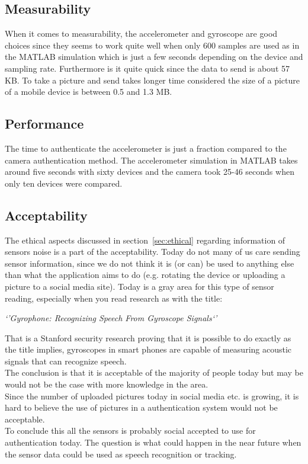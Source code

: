 \subsection*{Measurability}
When it comes to measurability, the accelerometer and gyroscope are good choices since they seems to work quite well when only 600 samples are used as in the MATLAB simulation which is just a few seconds depending on the device and sampling rate. Furthermore is it quite quick since the data to send is about 57 KB. To take a picture and send takes longer time considered the size of a picture of a mobile device is between 0.5 and 1.3 MB. 

\subsection*{Performance}
The time to authenticate the accelerometer is just a fraction compared to the camera authentication method. The accelerometer simulation in MATLAB takes around five seconds with sixty devices and the camera took 25-46 seconds when only ten devices were compared.

\subsection*{Acceptability}
The ethical aspects discussed in section~\ref{sec:ethical} regarding information of sensors noise is a part of the acceptability. Today do not many of us care sending sensor information, since we do not think it is (or can) be used to anything else than what the application aims to do (e.g. rotating the device or uploading a picture to a social media site). Today is a gray area for this type of sensor reading, especially when you read research as with the title:
\begin{center}
\textit{`'Gyrophone: Recognizing Speech From Gyroscope Signals`'}
\end{center}
That is a Stanford security research proving that it is possible to do exactly as the title implies, gyroscopes in smart phones are capable of measuring acoustic signals that can recognize speech.~\cite[]{stanGyro}\\
The conclusion is that it is acceptable of the majority of people today but may be would not be the case with more knowledge in the area.\\
Since the number of uploaded pictures today in social media etc. is growing, it is hard to believe the use of pictures in a authentication system would not be acceptable. \\
To conclude this all the sensors is probably social accepted to use for authentication today. The question is what could happen in the near future when the sensor data could be used as speech recognition or tracking.

